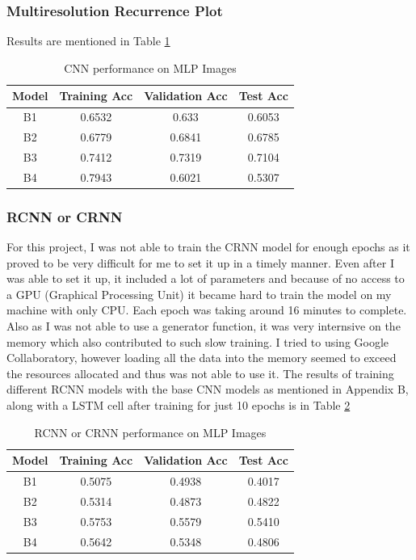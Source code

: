 \documentclass[letterpaper, 12 pt, conference]{ieeeconf}  %
\begin{document}
\subsubsection{Multiresolution Recurrence Plot}
Results are mentioned in Table \ref{tab:MLP_Acc}
\begin{table}[!h]
\centering
\caption{CNN performance on MLP Images}
\begin{tabular}{| c || c || c || c |} %
\hline %
Model & Training Acc & Validation Acc & Test Acc\\
   \hline \hline
B1 & 0.6532 & 0.633 & 0.6053 \\
\hline
B2 & 0.6779 & 0.6841 & 0.6785 \\
\hline
B3 & 0.7412 & 0.7319 & 0.7104 \\	
\hline
B4 & 0.7943 & 0.6021 & 0.5307  \\
\hline
   \end{tabular}
\label{tab:MLP_Acc} 
\end{table}


\subsubsection{RCNN or CRNN}
For this project, I was not able to train the CRNN model for enough epochs as it proved to be very difficult for me to set it up in a timely manner. Even after I was able to set it up, it included a lot of parameters and because of no access to a GPU (Graphical Processing Unit) it became hard to train the model on my machine with only CPU. Each epoch was taking around 16 minutes to complete. Also as I was not able to use a generator function, it was very internsive on the memory which also contributed to such slow training. I tried to using Google Collaboratory, however loading all the data into the memory seemed to exceed the resources allocated and thus was not able to use it.  The results of training different RCNN models with the base CNN models as mentioned in Appendix B, along with a LSTM cell after training for just 10 epochs is in Table \ref{tab:CRNN_Acc}

\begin{table}[!h]
\centering
\caption{RCNN or CRNN performance on MLP Images}
\begin{tabular}{| c || c || c || c |} %
\hline %
Model & Training Acc & Validation Acc & Test Acc\\
   \hline \hline
B1 & 0.5075 & 0.4938 & 0.4017 \\
\hline
B2 & 0.5314 & 0.4873 & 0.4822 \\
\hline
B3 & 0.5753 & 0.5579 & 0.5410 \\	
\hline
B4 & 0.5642 & 0.5348 & 0.4806  \\
\hline
   \end{tabular}
\label{tab:CRNN_Acc} 
\end{table}
\end{document}
